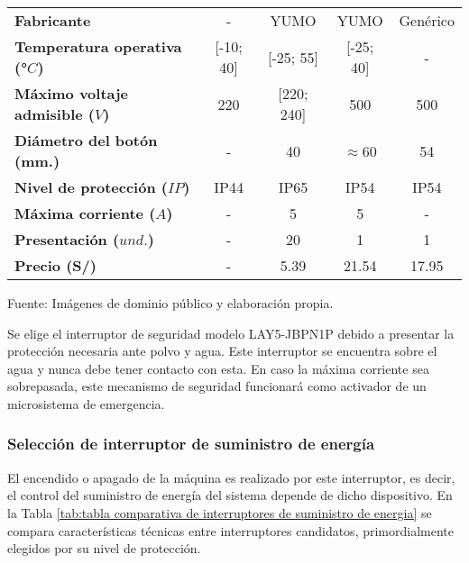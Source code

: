 \begin{mytable}[H]
\begin{tabular}{l|c|c|c|c|}
\begin{minipage}{\mythirdmaxsizeofcontenttable}
		\end{minipage}  \\ \hline
		\multicolumn{1}{|l|}{\textbf{Fabricante}} & - & YUMO & YUMO & Genérico \\ \hline
		\multicolumn{1}{|l|}{\textbf{Temperatura operativa (°$C$)}} & [-10; 40] & [-25; 55] & [-25; 40] & - \\ \hline
		\multicolumn{1}{|l|}{
			\begin{minipage}{\myforthmaxsizeofcontenttable}			
				\textbf{Máximo voltaje admisible ($V$)}
			\end{minipage}
		} & 220 & [220; 240] & 500 & 500 \\ \hline
		\multicolumn{1}{|l|}{
			\begin{minipage}{\myforthmaxsizeofcontenttable}			
				\textbf{Diámetro del botón (mm.)}
			\end{minipage}
		} & - & 40 & $\approx$60 & 54 \\ \hline
		\multicolumn{1}{|l|}{\textbf{Nivel de protección ($IP$)}} & IP44 & IP65 & IP54 & IP54 \\ \hline
		\multicolumn{1}{|l|}{\textbf{Máxima corriente ($A$)}} & - & 5 & 5 & - \\ \hline
		\multicolumn{1}{|l|}{\textbf{Presentación ($und.$)}} & - & 20 & 1 & 1 \\ \hline
		\multicolumn{1}{|l|}{\textbf{Precio (S/)}} & - & 5.39 & 21.54 & 17.95 \\ \hline
	\end{tabular}
	\begin{myflushcenteraftertable}	
		Fuente: Imágenes de dominio público y elaboración propia.
	\end{myflushcenteraftertable}
\end{mytable}

Se elige el interruptor de seguridad modelo LAY5-JBPN1P debido a presentar la protección necesaria ante polvo y agua. Este interruptor se encuentra sobre el agua y nunca debe tener contacto con esta. En caso la máxima corriente sea sobrepasada, este mecanismo de seguridad funcionará como activador de un microsistema de  emergencia.


\subsubsection{Selección de interruptor de suministro de energía}

El encendido o apagado de la máquina es realizado por este interruptor, es decir, el control del suministro de energía del sistema depende de dicho dispositivo. En la Tabla \ref{tab:tabla comparativa de interruptores de suministro de energia} se compara características técnicas entre interruptores candidatos, primordialmente elegidos por su nivel de protección.

